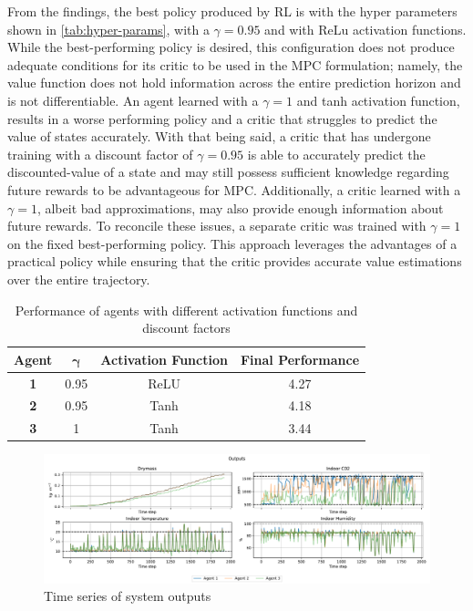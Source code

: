 From the findings, the best policy produced by RL is with the hyper parameters shown in \autoref{tab:hyper-params}, with a $\gamma = 0.95$  and with ReLu activation functions. While the best-performing policy is desired, this configuration does not produce adequate conditions for its critic to be used in the MPC formulation; namely, the value function does not hold information across the entire prediction horizon and is not differentiable. An agent learned with a $\gamma = 1$ and tanh activation function, results in a worse performing policy and a critic that struggles to predict the value of states accurately. With that being said, a critic that has undergone training with a discount factor of $\gamma = 0.95$ is able to accurately predict the discounted-value of a state and may still possess sufficient knowledge regarding future rewards to be advantageous for MPC. Additionally, a critic learned with a $\gamma = 1$, albeit bad approximations, may also provide enough information about future rewards. To reconcile these issues, a separate critic was trained with $\gamma = 1$ on the fixed best-performing policy. This approach leverages the advantages of a practical policy while ensuring that the critic provides accurate value estimations over the entire trajectory. 

\begin{table}[h!]
	\centering
	\begin{tabular}{c c c c}
		\toprule
		\textbf{Agent} & $\boldsymbol{\gamma}$ & \textbf{Activation Function} & \textbf{Final Performance} \\
		\midrule
		\textbf{ 1} & 0.95 & ReLU & 4.27 \\
		\textbf{ 2} & 0.95 & Tanh & 4.18 \\
		\textbf{ 3} & 1 & Tanh & 3.44 \\
		\bottomrule
	\end{tabular}
	\caption{Performance of agents with different activation functions and discount factors}
	\label{tab:selected_agents}
\end{table}

\begin{figure}[H]
    \centering
    \includegraphics[width = \textwidth]{figures/selected_policies_outputs.pdf}
    \caption{Time series of system outputs}
    \label{fig:selected-policies-outputs}
\end{figure}

